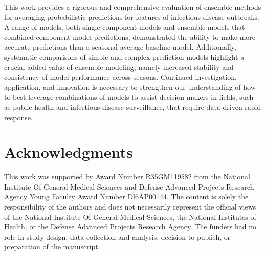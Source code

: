 \documentclass[10pt,letterpaper]{article}
\begin{document}
This work provides a rigorous and comprehensive evaluation of ensemble
methods for averaging probabilistic predictions for features of
infectious disease outbreaks. A range of models, both single component
models and ensemble models that combined component model predictions,
demonstrated the ability to make more accurate predictions than a
seasonal average baseline model. Additionally, systematic comparisons of
simple and complex prediction models highlight a crucial added value of
ensemble modeling, namely increased stability and consistency of model
performance across seasons. Continued investigation, application, and
innovation is necessary to strengthen our understanding of how to best
leverage combinations of models to assist decision makers in fields,
such as public health and infectious disease surveillance, that require
data-driven rapid response.

\section{Acknowledgments}\label{acknowledgments}

This work was supported by Award Number R35GM119582 from the National
Institute Of General Medical Sciences and Defense Advanced Projects
Research Agency Young Faculty Award Number Dl6AP00144. The content is
solely the responsibility of the authors and does not necessarily
represent the official views of the National Institute Of General
Medical Sciences, the National Institutes of Health, or the Defense
Advanced Projects Research Agency. The funders had no role in study
design, data collection and analysis, decision to publish, or
preparation of the manuscript.



\hypertarget{refs}{}
\end{document}
